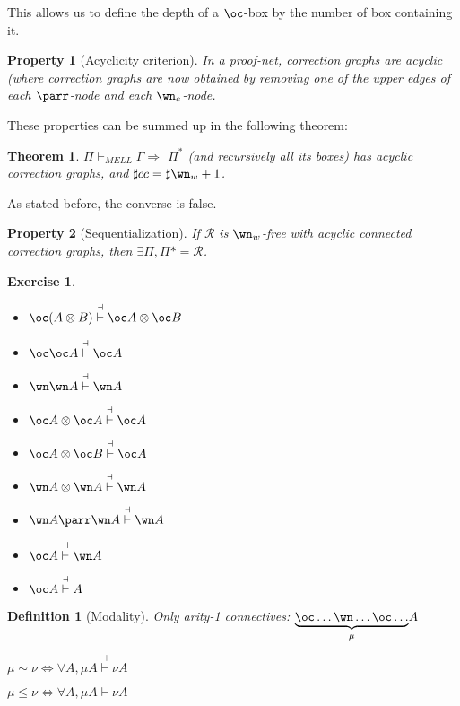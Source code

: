 \documentclass[a4paper,10pt]{article}
\newtheorem{definition}{Definition}
\newtheorem{prop}{Property}
\newtheorem{theo}{Theorem}
\newtheorem{exo}{Exercise}
\begin{document}
	This allows us to define the depth of a $\oc $-box by the number of box containing it.
	
	\begin{prop}[Acyclicity criterion]
		In a proof-net, correction graphs are acyclic (where correction graphs are now obtained by removing one of the upper edges of each $\parr$-node and each $\wn_c$-node.
	\end{prop}	
	
	These properties can be summed up in the following theorem:
	
	\begin{theo}
		$\Pi \vdash_{MELL} \Gamma \Rightarrow$ $\Pi^*$ (and recursively all its boxes) has acyclic correction graphs, and $\sharp cc = \sharp \wn_w +1$.
	\end{theo}	
	
	As stated before, the converse is false.
	
	\begin{prop}[Sequentialization]
		If $\mathcal R$ is $\wn_w$-free with acyclic connected correction graphs, then $\exists \Pi, \Pi* = \mathcal R$.
	\end{prop}	
	
	\begin{exo}
		\begin{multicols}{2}
		\begin{itemize}
			\item $\oc (A\otimes B)\overset{\dashv}{\vdash} \oc A \otimes \oc B$
			\item $\oc \oc A \overset{\dashv}{\vdash} \oc A$
			\item $\wn\wn A \overset{\dashv}{\vdash} \wn A$
			\item $\oc A \otimes \oc A\overset{\dashv}{\vdash} \oc A$
			\item $\oc A \otimes \oc B\overset{\dashv}{\vdash} \oc A$
			\item $\wn A \otimes \wn A\overset{\dashv}{\vdash}\wn A$
			\item $\wn A \parr \wn A\overset{\dashv}{\vdash}\wn A$
			\item $\oc A\overset{\dashv}{\vdash}\wn A$
			\item $\oc A\overset{\dashv}{\vdash}A$
		\end{itemize}	
		\end{multicols}
	\end{exo}	
	
	\begin{definition}[Modality]
		Only arity-1 connectives: $\underset{\mu}{\underbrace{\oc \dots \wn \dots \oc  \dots}}A$
		
		$\mu \sim \nu \Leftrightarrow \forall A, \mu A \overset{\dashv}{\vdash} \nu A$
		
		$\mu \le \nu \Leftrightarrow \forall A, \mu A \vdash \nu A$
	\end{definition}	
	
\end{document}
